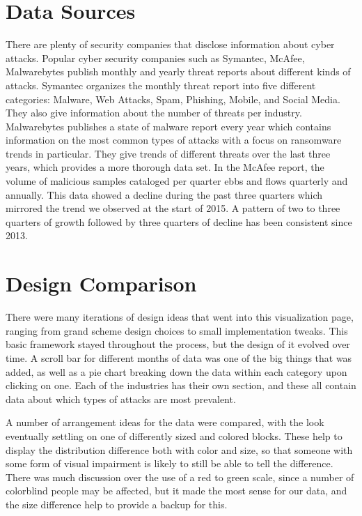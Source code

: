 \documentclass[journal]{vgtc}                %
\begin{document}
\section{Data Sources}
There are plenty of security companies that disclose information about cyber attacks. 
Popular cyber security companies such as Symantec, McAfee, Malwarebytes publish monthly and yearly threat reports about different kinds of attacks. 
Symantec organizes the monthly threat report into five different categories: Malware, Web Attacks, Spam, Phishing, Mobile, and Social Media. 
They also give information about the number of threats per industry. \cite{SMR}
Malwarebytes publishes a state of malware report every year which contains information on the most common types of attacks with a focus on ransomware trends in particular. 
They give trends of different threats over the last three years, which provides a more thorough data set. \cite{MWB}
In the McAfee report, the volume of malicious samples cataloged per quarter ebbs and flows quarterly and annually. 
This data showed a decline during the past three quarters which mirrored the trend we observed at the start of 2015. 
A pattern of two to three quarters of growth followed by three quarters of decline has been consistent since 2013. \cite{QT17}

\section{Design Comparison}
There were many iterations of design ideas that went into this visualization page, ranging from grand scheme design choices to small implementation tweaks.
This basic framework stayed throughout the process, but the design of it evolved over time. 
A scroll bar for different months of data was one of the big things that was added, as well as a pie chart breaking down the data within each category upon clicking on one.
Each of the industries has their own section, and these all contain data about which types of attacks are most prevalent.

A number of arrangement ideas for the data were compared, with the look eventually settling on one of differently sized and colored blocks.
These help to display the distribution difference both with color and size, so that someone with some form of visual impairment is likely to still be able to tell the difference.
There was much discussion over the use of a red to green scale, since a number of colorblind people may be affected, but it made the most sense for our data, and the size difference help to provide a backup for this.
\end{document}
